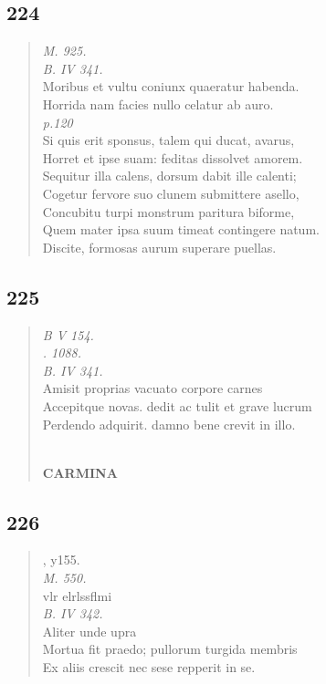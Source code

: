 \documentclass[11pt, a4paper]{report}
\begin{document}
            \subsection*{224}
      \begin{verse}
      \textit{M. 925.} \\ \textit{B. IV 341.} \\ Moribus et vultu coniunx quaeratur habenda. \\ Horrida nam facies nullo celatur ab auro. \\ \textit{p.120} \\ Si quis erit sponsus, talem qui ducat, avarus, \\ Horret et ipse suam: feditas dissolvet amorem. \\ Sequitur illa calens, dorsum dabit ille calenti; \\ Cogetur fervore suo clunem submittere asello, \\ Concubitu turpi monstrum paritura biforme, \\ Quem mater ipsa suum timeat contingere natum. \\ Discite, formosas aurum superare puellas. \\ 
      \end{verse}
  
            \subsection*{225}
      \begin{verse}
      \textit{B V 154.} \\ \textit{. 1088.} \\ \textit{B. IV 341.} \\ Amisit proprias vacuato corpore carnes \\ Accepitque novas. dedit ac tulit et grave lucrum \\ Perdendo adquirit. damno bene crevit in illo. \\ 
        ﻿\pagebreak 
     \marginpar{[190]} \begin{center} \textbf{CARMINA} \end{center}
      \end{verse}
  
            \subsection*{226}
      \begin{verse}
      , y155. \\ \textit{M. 550.} \\ vlr elrlssflmi \\ \textit{B. IV 342.} \\ Aliter unde upra \\ Mortua fit praedo; pullorum turgida membris \\ Ex aliis crescit nec sese repperit in se. \\ 
      \end{verse}
  
\end{document}
